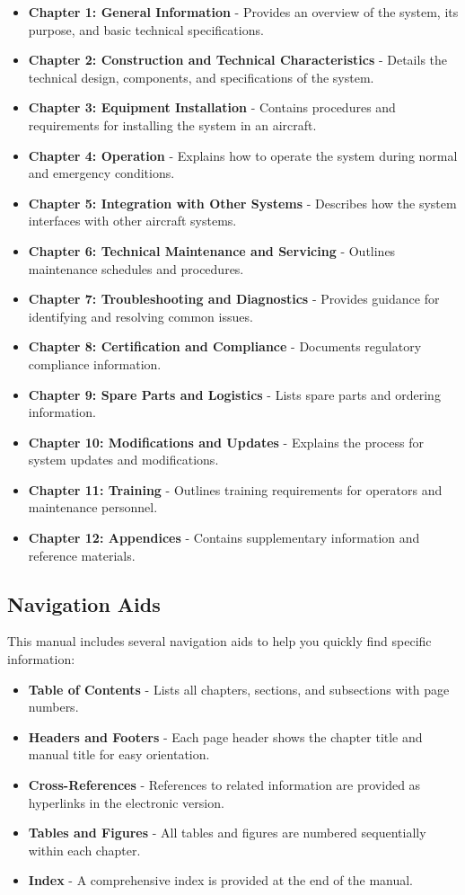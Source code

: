 \documentclass[12pt,a4paper,twoside,openright]{book}
\begin{document}
\begin{itemize}
    \item \textbf{Chapter 1: General Information} - Provides an overview of the system, its purpose, and basic technical specifications.
    \item \textbf{Chapter 2: Construction and Technical Characteristics} - Details the technical design, components, and specifications of the system.
    \item \textbf{Chapter 3: Equipment Installation} - Contains procedures and requirements for installing the system in an aircraft.
    \item \textbf{Chapter 4: Operation} - Explains how to operate the system during normal and emergency conditions.
    \item \textbf{Chapter 5: Integration with Other Systems} - Describes how the system interfaces with other aircraft systems.
    \item \textbf{Chapter 6: Technical Maintenance and Servicing} - Outlines maintenance schedules and procedures.
    \item \textbf{Chapter 7: Troubleshooting and Diagnostics} - Provides guidance for identifying and resolving common issues.
    \item \textbf{Chapter 8: Certification and Compliance} - Documents regulatory compliance information.
    \item \textbf{Chapter 9: Spare Parts and Logistics} - Lists spare parts and ordering information.
    \item \textbf{Chapter 10: Modifications and Updates} - Explains the process for system updates and modifications.
    \item \textbf{Chapter 11: Training} - Outlines training requirements for operators and maintenance personnel.
    \item \textbf{Chapter 12: Appendices} - Contains supplementary information and reference materials.
\end{itemize}

\subsection{Navigation Aids}

This manual includes several navigation aids to help you quickly find specific information:

\begin{itemize}
    \item \textbf{Table of Contents} - Lists all chapters, sections, and subsections with page numbers.
    \item \textbf{Headers and Footers} - Each page header shows the chapter title and manual title for easy orientation.
    \item \textbf{Cross-References} - References to related information are provided as hyperlinks in the electronic version.
    \item \textbf{Tables and Figures} - All tables and figures are numbered sequentially within each chapter.
    \item \textbf{Index} - A comprehensive index is provided at the end of the manual.
\end{itemize}
\end{document}
